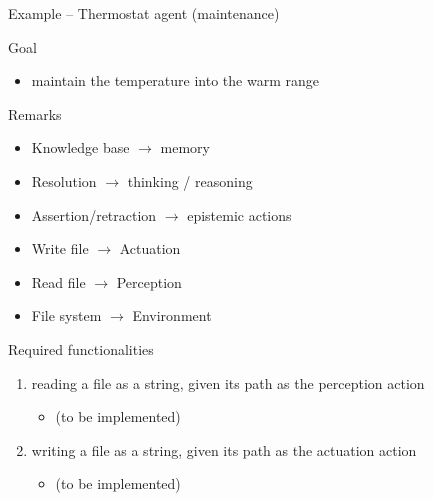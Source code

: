 \documentclass[presentation]{beamer}\mode<presentation>{\usetheme{AMSBolognaFC}}
\begin{document}
\begin{frame}[allowframebreaks]{Example -- Thermostat agent (maintenance)}


    \framebreak

    \begin{exampleblock}{Goal}
        \begin{itemize}
            \item \alert{maintain} the temperature into the \alert{warm} range
        \end{itemize}
    \end{exampleblock}

    \begin{alertblock}{Remarks}
        \begin{itemize}
            \item Knowledge base $\rightarrow$ memory
            \item Resolution $\rightarrow$ thinking / reasoning
            \item Assertion/retraction $\rightarrow$ epistemic actions
            \item \alert{Write file $\rightarrow$ Actuation}
            \item \alert{Read file $\rightarrow$ Perception}
            \item \alert{File system $\rightarrow$ Environment}
        \end{itemize}
    \end{alertblock}

    \begin{block}{Required functionalities}
        \begin{enumerate}    
            \item reading a file as a string, given its path as the perception action
            \begin{itemize}
                \item {} \alert{(to be implemented)}
            \end{itemize}

            \item writing a file as a string, given its path as the actuation action
            \begin{itemize}
                \item {} \alert{(to be implemented)}
            \end{itemize}


\end{enumerate}
\end{block}
\end{frame}
\end{document}
